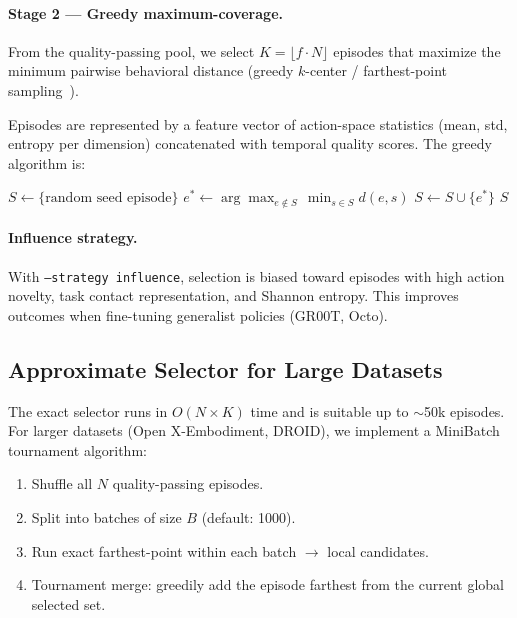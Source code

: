 \documentclass[10pt,twocolumn]{article}
\begin{document}
\paragraph{Stage 2 --- Greedy maximum-coverage.}
From the quality-passing pool, we select $K = \lfloor f \cdot N \rfloor$
episodes that maximize the minimum pairwise behavioral distance (greedy
$k$-center / farthest-point sampling~\citep{gonzalez1985}).

Episodes are represented by a feature vector of action-space statistics
(mean, std, entropy per dimension) concatenated with temporal quality scores.
The greedy algorithm is:
\begin{algorithm}[H]
\caption{Greedy Farthest-Point Coreset Selection}
\begin{algorithmic}[1]
\State $S \leftarrow \{\text{random seed episode}\}$
  \State $e^* \leftarrow \arg\max_{e \notin S}\, \min_{s \in S} d(e, s)$
  \State $S \leftarrow S \cup \{e^*\}$
\EndFor
\State \Return $S$
\end{algorithmic}
\end{algorithm}

\paragraph{Influence strategy.}
With \texttt{--strategy influence}, selection is biased toward episodes with
high action novelty, task contact representation, and Shannon entropy.
This improves outcomes when fine-tuning generalist policies (GR00T, Octo).

\subsection{Approximate Selector for Large Datasets}

The exact selector runs in $O(N \times K)$ time and is suitable up to
$\sim$50k episodes. For larger datasets (Open X-Embodiment, DROID), we
implement a MiniBatch tournament algorithm:

\begin{enumerate}[nosep]
  \item Shuffle all $N$ quality-passing episodes.
  \item Split into batches of size $B$ (default: 1000).
  \item Run exact farthest-point within each batch $\to$ local candidates.
  \item Tournament merge: greedily add the episode farthest from the current
    global selected set.
\end{enumerate}
\end{document}
